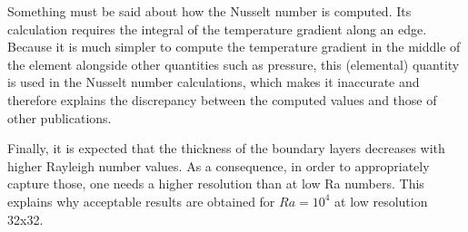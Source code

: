 Something must be said about how the Nusselt number is computed. 
Its calculation requires the integral of the temperature gradient along an edge. 
Because it is much simpler to compute the temperature gradient in the middle of the 
element alongside other quantities such as pressure, this (elemental) quantity is 
used in the Nusselt number calculations, which makes it inaccurate and therefore 
explains the discrepancy between the computed values and those of other publications.

Finally, it is expected that the thickness of the 
boundary layers decreases with higher Rayleigh number values.
As a consequence, in order to appropriately capture those, one needs 
a higher resolution than at low Ra numbers. This explains why 
acceptable results are obtained for $Ra=10^4$  at low resolution 32x32.


\newpage
